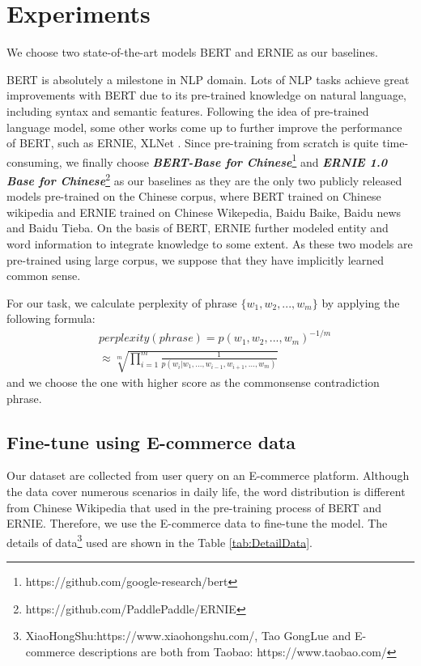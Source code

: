 \section{Experiments}
We choose two state-of-the-art models BERT \cite{devlin2018bert} and ERNIE \cite{sun2019ernie} as our baselines. 

BERT is absolutely a milestone in NLP domain. Lots of NLP tasks achieve great improvements with BERT due to its pre-trained knowledge on natural language, including syntax and semantic features. 
Following the idea of pre-trained language model, some other works come up to further improve the performance of BERT, such as ERNIE, XLNet \cite{yang2019xlnet}. 
Since pre-training from scratch %
is quite time-consuming, we finally choose \textbf{\textit{BERT-Base for Chinese}}\footnote{https://github.com/google-research/bert}  and \textbf{\textit{ERNIE 1.0 Base for Chinese}}\footnote{https://github.com/PaddlePaddle/ERNIE} as our baselines as they are the only two publicly released models pre-trained on the Chinese corpus, where BERT trained on Chinese wikipedia and ERNIE trained on Chinese Wikepedia, Baidu Baike, Baidu news and Baidu Tieba. 
On the basis of BERT, ERNIE further modeled entity and word information to integrate knowledge to some extent.
As these two models are pre-trained using large corpus, we %
suppose that they have implicitly learned common sense.%

For our task, we calculate perplexity of phrase $\{w_1, w_2, ..., w_m\}$ %
by applying the following formula:
\begin{equation}
\label{ppl}
\begin{split}
&perplexity(phrase) = p(w_1, w_2, ..., w_m)^{-1/m} \\
&\approx \sqrt[m]{\prod_{i=1}^{m}\frac{1}{p(w_i|w_1,...,w_{i-1},w_{i+1},..., w_m)}}
\end{split}
\end{equation}
and we choose the one with higher score as the commonsense contradiction phrase.



\subsection{Fine-tune using E-commerce data}
Our dataset are collected from user query on an E-commerce platform. Although the data cover numerous scenarios in daily life, the word distribution is different from Chinese Wikipedia that used in the pre-training process of BERT and ERNIE. Therefore, we use the E-commerce data to fine-tune the model. The details of data\footnote{XiaoHongShu:https://www.xiaohongshu.com/, Tao GongLue and E-commerce descriptions are both from Taobao: https://www.taobao.com/} used are shown in the Table \ref{tab:DetailData}.

